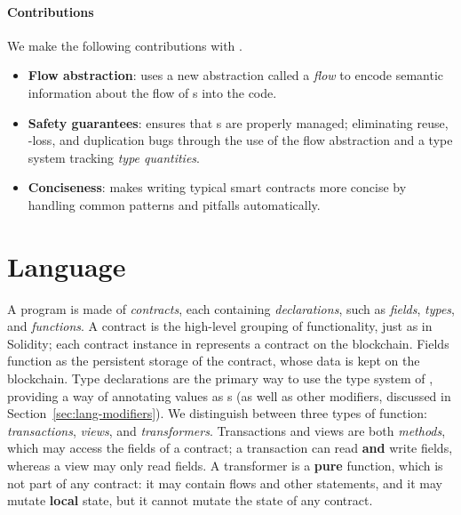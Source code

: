\documentclass[dvipsnames, usenames, sigconf]{acmart}
\begin{document}
\paragraph{Contributions}

We make the following contributions with \langName.
\begin{itemize}
    \item \textbf{Flow abstraction}: \langName uses a new abstraction called a \emph{flow} to encode semantic information about the flow of \assetTxt{}s into the code.
    \item \textbf{Safety guarantees}: \langName ensures that \assetTxt{}s are properly managed; eliminating reuse, \assetTxt-loss, and duplication bugs through the use of the flow abstraction and a type system tracking \emph{type quantities}.
    \item \textbf{Conciseness}: \langName makes writing typical smart contracts more concise by handling common patterns and pitfalls automatically.
\end{itemize}


\section{Language}\label{sec:lang}
A \langName program is made of \emph{contracts}, each containing \emph{declarations}, such as \emph{fields}, \emph{types}, and \emph{functions}.
A contract is the high-level grouping of functionality, just as in Solidity; each contract instance in \langName represents a contract on the blockchain.
Fields function as the persistent storage of the contract, whose data is kept on the blockchain.
Type declarations are the primary way to use the type system of \langName, providing a way of annotating values as \assetTxt{}s (as well as other modifiers, discussed in Section~\ref{sec:lang-modifiers}).
We distinguish between three types of function: \emph{transactions}, \emph{views}, and \emph{transformers}.
Transactions and views are both \emph{methods}, which may access the fields of a contract; a transaction can read \textbf{and} write fields, whereas a view may only read fields.
A transformer is a \textbf{pure} function, which is not part of any contract: it may contain flows and other statements, and it may mutate \textbf{local} state, but it cannot mutate the state of any contract.
\end{document}
